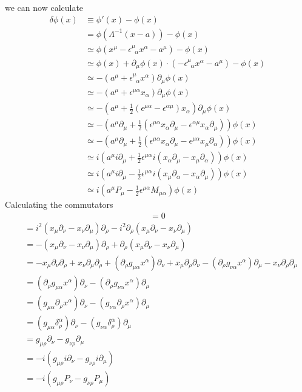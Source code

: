 \documentclass[10pt,a4paper]{book}
\theoremstyle{definition}
\begin{document}
we can now calculate 
\begin{align}
\delta\phi(x)
&\equiv\phi'(x)-\phi(x)\\
&=\phi(\Lambda^{-1}(x-a))-\phi(x)\\
&\simeq\phi(x^\mu-\epsilon^\mu_{\;\;\alpha}x^\alpha-a^\mu)-\phi(x)\\
&\simeq\phi(x)+\partial_\mu\phi(x)\cdot(-\epsilon^\mu_{\;\;\alpha}x^\alpha-a^\mu)-\phi(x)\\
&\simeq-(a^\mu+\epsilon^\mu_{\;\;\alpha}x^\alpha)\partial_\mu\phi(x)\\
&\simeq-(a^\mu+\epsilon^{\mu\alpha}x_\alpha)\partial_\mu\phi(x)\\
&\simeq-\left(a^\mu+\frac{1}{2}\left(\epsilon^{\mu\alpha}-\epsilon^{\alpha\mu}\right)x_\alpha\right)\partial_\mu\phi(x)\\
&\simeq-\left(a^\mu\partial_\mu+\frac{1}{2}\left(\epsilon^{\mu\alpha}x_\alpha\partial_\mu-\epsilon^{\alpha\mu}x_\alpha\partial_\mu\right)\right)\phi(x)\\
&\simeq-\left(a^\mu\partial_\mu+\frac{1}{2}\left(\epsilon^{\mu\alpha}x_\alpha\partial_\mu-\epsilon^{\mu\alpha}x_\mu\partial_\alpha\right)\right)\phi(x)\\
&\simeq i\left(a^\mu i\partial_\mu+\frac{1}{2}\epsilon^{\mu\alpha}i\left(x_\alpha\partial_\mu-x_\mu\partial_\alpha\right)\right)\phi(x)\\
&\simeq i\left(a^\mu i\partial_\mu-\frac{1}{2}\epsilon^{\mu\alpha}i\left(x_\mu\partial_\alpha-x_\alpha\partial_\mu\right)\right)\phi(x)\\
&\simeq i\left(a^\mu P_\mu-\frac{1}{2}\epsilon^{\mu\alpha}M_{\mu\alpha}\right)\phi(x)
\end{align}
Calculating the commutators
\begin{align}
[P_\mu,P_\nu]=0
\end{align}
\begin{align}
[M_{\mu\nu},P_\rho]
&=i^2(x_\mu\partial_\nu-x_\nu\partial_\mu)\partial_\rho-i^2\partial_\rho(x_\mu\partial_\nu-x_\nu\partial_\mu)\\
&=-(x_\mu\partial_\nu-x_\nu\partial_\mu)\partial_\rho+\partial_\rho(x_\mu\partial_\nu-x_\nu\partial_\mu)\\
&=-x_\mu\partial_\nu\partial_\rho+x_\nu\partial_\mu\partial_\rho+ (\partial_\rho g_{\mu\alpha}x^\alpha)\partial_\nu+x_\mu\partial_\rho\partial_\nu
-(\partial_\rho g_{\nu\alpha}x^\alpha)\partial_\mu-x_\nu\partial_\rho\partial_\mu\\
&=(\partial_\rho g_{\mu\alpha}x^\alpha)\partial_\nu
-(\partial_\rho g_{\nu\alpha}x^\alpha)\partial_\mu\\
&=(g_{\mu\alpha}\partial_\rho x^\alpha)\partial_\nu
-(g_{\nu\alpha}\partial_\rho x^\alpha)\partial_\mu\\
&=(g_{\mu\alpha}\delta^\alpha_\rho)\partial_\nu
-(g_{\nu\alpha}\delta^\alpha_\rho)\partial_\mu\\
&=g_{\mu\rho}\partial_\nu
-g_{\nu\rho}\partial_\mu\\
&=-i(g_{\mu\rho}i\partial_\nu
-g_{\nu\rho}i\partial_\mu)\\
&=-i(g_{\mu\rho}P_\nu
-g_{\nu\rho}P_\mu)
\end{align}
\end{document}
